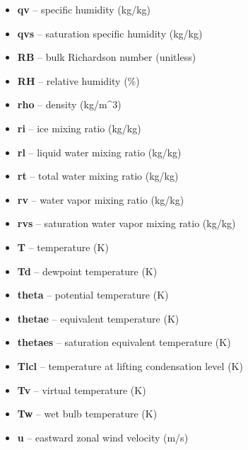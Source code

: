 \documentclass[letterpaper,10pt,english]{sphinxmanual}
\begin{document}
\begin{fulllineitems}
\begin{itemize}
\item {} 
\textbf{qv} -- specific humidity (kg/kg)

\item {} 
\textbf{qvs} -- saturation specific humidity (kg/kg)

\item {} 
\textbf{RB} -- bulk Richardson number (unitless)

\item {} 
\textbf{RH} -- relative humidity (\%)

\item {} 
\textbf{rho} -- density (kg/m\textasciicircum{}3)

\item {} 
\textbf{ri} -- ice mixing ratio (kg/kg)

\item {} 
\textbf{rl} -- liquid water mixing ratio (kg/kg)

\item {} 
\textbf{rt} -- total water mixing ratio (kg/kg)

\item {} 
\textbf{rv} -- water vapor mixing ratio (kg/kg)

\item {} 
\textbf{rvs} -- saturation water vapor mixing ratio (kg/kg)

\item {} 
\textbf{T} -- temperature (K)

\item {} 
\textbf{Td} -- dewpoint temperature (K)

\item {} 
\textbf{theta} -- potential temperature (K)

\item {} 
\textbf{thetae} -- equivalent temperature (K)

\item {} 
\textbf{thetaes} -- saturation equivalent temperature (K)

\item {} 
\textbf{Tlcl} -- temperature at lifting condensation level (K)

\item {} 
\textbf{Tv} -- virtual temperature (K)

\item {} 
\textbf{Tw} -- wet bulb temperature (K)

\item {} 
\textbf{u} -- eastward zonal wind velocity (m/s)


\end{itemize}
\end{fulllineitems}
\end{document}
